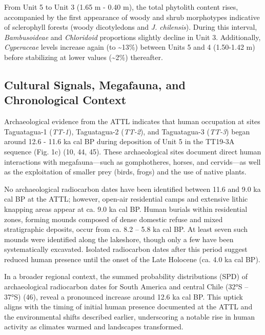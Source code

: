 \documentclass[
]{article}
\begin{document}
From Unit 5 to Unit 3 (1.65 m - 0.40 m), the total phytolith content
rises, accompanied by the first appearance of woody and shrub
morphotypes indicative of sclerophyll forests (woody dicotyledons and
\emph{J. chilensis}). During this interval, \emph{Bambusoideae} and
\emph{Chloridoid} proportions slightly decline in Unit 3. Additionally,
\emph{Cyperaceae} levels increase again (to \textasciitilde13\%) between
Units 5 and 4 (1.50-1.42 m) before stabilizing at lower values
(\textasciitilde2\%) thereafter.

\subsection{Cultural Signals, Megafauna, and Chronological
Context}\label{cultural-signals-megafauna-and-chronological-context}

Archaeological evidence from the ATTL indicates that human occupation at
sites Taguatagua-1 (\emph{TT-1}), Taguatagua-2 (\emph{TT-2}), and
Taguatagua-3 (\emph{TT-3}) began around 12.6 - 11.6 ka cal BP during
deposition of Unit 5 in the TT19-3A sequence (Fig. 1c) (10, 44, 45).
These archaeological sites document direct human interactions with
megafauna---such as gomphotheres, horses, and cervids---as well as the
exploitation of smaller prey (birds, frogs) and the use of native
plants.

No archaeological radiocarbon dates have been identified between 11.6
and 9.0 ka cal BP at the ATTL; however, open-air residential camps and
extensive lithic knapping areas appear at ca. 9.0 ka cal BP. Human
burials within residential zones, forming mounds composed of dense
domestic refuse and mixed stratigraphic deposits, occur from ca. 8.2 --
5.8 ka cal BP. At least seven such mounds were identified along the
lakeshore, though only a few have been systematically excavated.
Isolated radiocarbon dates after this period suggest reduced human
presence until the onset of the Late Holocene (ca. 4.0 ka cal BP).

In a broader regional context, the summed probability distributions
(SPD) of archaeological radiocarbon dates for South America and central
Chile (32°S -- 37°S) (46), reveal a pronounced increase around 12.6 ka
cal BP. This uptick aligns with the timing of initial human presence
documented at the ATTL and the environmental shifts described earlier,
underscoring a notable rise in human activity as climates warmed and
landscapes transformed.
\end{document}
